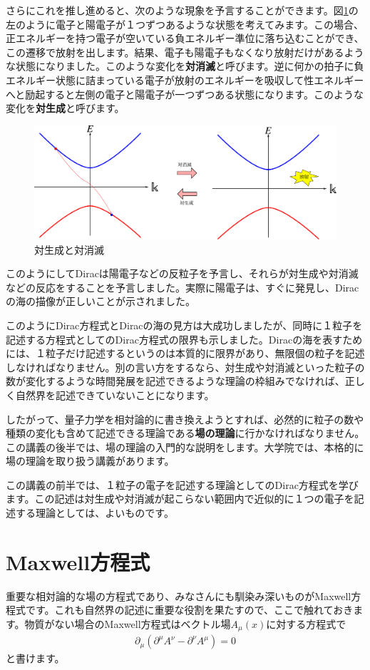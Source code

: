 \documentclass[report,paper=a4, fontsize=12pt, line_length=16cm, number_of_lines=33,dvipdfmx]{jlreq}
\numberwithin{equation}{chapter}
\newcommand{\del}{\partial}
\newcommand{\strong}[1]{{\sffamily \bfseries #1}}
\begin{document}
さらにこれを推し進めると、次のような現象を予言することができます。図\ref{fig:paircreation}の左のように電子と陽電子が１つずつあるような状態を考えてみます。この場合、正エネルギーを持つ電子が空いている負エネルギー準位に落ち込むことができ、この遷移で放射を出します。結果、電子も陽電子もなくなり放射だけがあるような状態になりました。このような変化を\strong{対消滅}と呼びます。逆に何かの拍子に負エネルギー状態に詰まっている電子が放射のエネルギーを吸収して性エネルギーへと励起すると左側の電子と陽電子が一つずつある状態になります。このような変化を\strong{対生成}と呼びます。
\begin{figure}[htbp]
  \centering
  \includegraphics[width=14cm]{paircreation.pdf}
  \caption{対生成と対消滅}
  \label{fig:paircreation}
\end{figure}

このようにしてDiracは陽電子などの反粒子を予言し、それらが対生成や対消滅などの反応をすることを予言しました。実際に陽電子は、すぐに発見し、Diracの海の描像が正しいことが示されました。

このようにDirac方程式とDiracの海の見方は大成功しましたが、同時に１粒子を記述する方程式としてのDirac方程式の限界も示しました。Diracの海を表すためには、１粒子だけ記述するというのは本質的に限界があり、無限個の粒子を記述しなければなりません。別の言い方をするなら、対生成や対消滅といった粒子の数が変化するような時間発展を記述できるような理論の枠組みでなければ、正しく自然界を記述できていないことになります。

したがって、量子力学を相対論的に書き換えようとすれば、必然的に粒子の数や種類の変化も含めて記述できる理論である\strong{場の理論}に行かなければなりません。この講義の後半では、場の理論の入門的な説明をします。大学院では、本格的に場の理論を取り扱う講義があります。

この講義の前半では、１粒子の電子を記述する理論としてのDirac方程式を学びます。この記述は対生成や対消滅が起こらない範囲内で近似的に１つの電子を記述する理論としては、よいものです。

\section{Maxwell方程式}
重要な相対論的な場の方程式であり、みなさんにも馴染み深いものがMaxwell方程式です。これも自然界の記述に重要な役割を果たすので、ここで触れておきます。物質がない場合のMaxwell方程式はベクトル場$A_{\mu}(x)$に対する方程式で
\begin{align}
  \del_{\mu}(\del^{\mu}A^{\nu}-\del^{\nu}A^{\mu})=0
\end{align}
と書けます。
\end{document}
